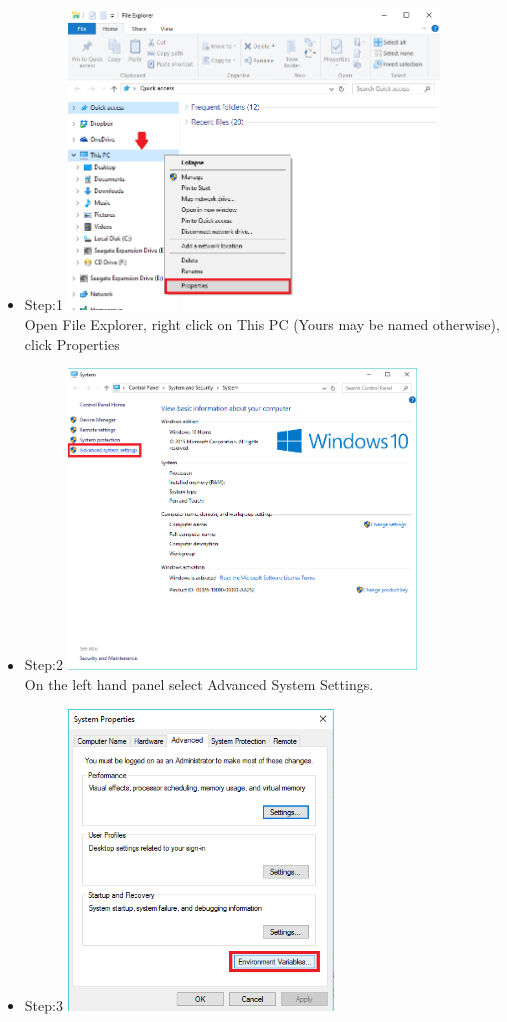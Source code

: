 \documentclass[a4paper,12pt]{report}
\begin{document}
	\begin{itemize}
		\item Step:1	\linebreak
		\includegraphics[height=8cm]{../Images/001.png}\\
		\linebreak
		Open File Explorer, right click on This PC (Yours may be named otherwise), click Properties
		\item Step:2	\linebreak
		\includegraphics[height=8cm]{../Images/002.png}\\ 
		\linebreak 
		On the left hand panel select Advanced System Settings.
		\pagebreak
		\item Step:3	\linebreak
		\includegraphics[height=8cm]{../Images/003.png}\\

\end{itemize}
\end{document}
